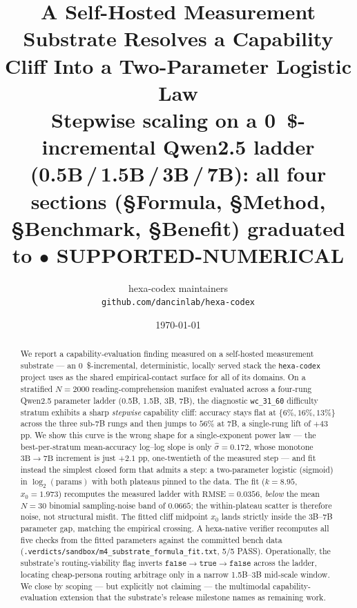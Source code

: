 \documentclass[11pt,a4paper]{article}
\title{
  \textbf{A Self-Hosted Measurement Substrate Resolves a Capability Cliff
  Into a Two-Parameter Logistic Law}\\[6pt]
  \large Stepwise scaling on a \SI{0}{\$}-incremental Qwen2.5 ladder
  (0.5B\,/\,1.5B\,/\,3B\,/\,7B): all four sections (\S Formula, \S Method,
  \S Benchmark, \S Benefit) graduated to \(\bullet\) SUPPORTED-NUMERICAL
}
\author{hexa-codex maintainers \\ \texttt{github.com/dancinlab/hexa-codex}}
\date{\today}
\newcommand{\vfile}[1]{\texttt{.verdicts/sandbox/#1}}
\begin{document}
\maketitle

\begin{abstract}
We report a capability-evaluation finding measured on a self-hosted
measurement substrate --- an \SI{0}{\$}-incremental, deterministic,
locally served stack the \texttt{hexa-codex} project uses as the shared
empirical-contact surface for all of its domains. On a stratified
\(N{=}2000\) reading-comprehension manifest evaluated across a four-rung
Qwen2.5 parameter ladder (0.5B, 1.5B, 3B, 7B), the diagnostic
\texttt{wc\_31\_60} difficulty stratum exhibits a sharp \emph{stepwise}
capability cliff: accuracy stays flat at \(\{6\%,16\%,13\%\}\) across the
three sub-7B rungs and then jumps to \(56\%\) at 7B, a single-rung lift of
\(+43\) pp. We show this curve is the wrong shape for a single-exponent
power law --- the best-per-stratum mean-accuracy log--log slope is only
\(\hat{\sigma}=0.172\), whose monotone \(3\text{B}\!\to\!7\text{B}\)
increment is just \(+2.1\) pp, one-twentieth of the measured step --- and
fit instead the simplest closed form that admits a step: a two-parameter
logistic (sigmoid) in \(\log_2(\text{params})\) with both plateaus pinned
to the data. The fit (\(k{=}8.95\), \(x_0{=}1.973\)) recomputes the
measured ladder with \(\mathrm{RMSE}=0.0356\), \emph{below} the mean
\(N{=}30\) binomial sampling-noise band of \(0.0665\); the within-plateau
scatter is therefore noise, not structural misfit. The fitted cliff
midpoint \(x_0\) lands strictly inside the 3B--7B parameter gap, matching
the empirical crossing. A hexa-native verifier recomputes all five checks
from the fitted parameters against the committed bench data
(\vfile{m4\_substrate\_formula\_fit.txt}, 5/5 PASS). Operationally, the
substrate's routing-viability flag inverts
\(\texttt{false}\!\to\!\texttt{true}\!\to\!\texttt{false}\) across the
ladder, locating cheap-persona routing arbitrage only in a narrow 1.5B--3B
mid-scale window. We close by scoping --- but explicitly not claiming ---
the multimodal capability-evaluation extension that the substrate's release
milestone names as remaining work.
\end{abstract}

\tableofcontents
\end{document}
